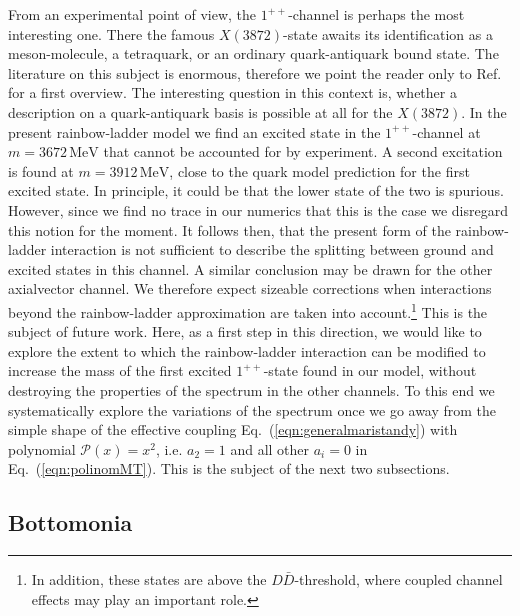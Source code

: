 From an experimental point of view, the $1^{++}$-channel is perhaps the most interesting
one. There the famous $X(3872)$-state awaits its identification as a meson-molecule,
a tetraquark, or an ordinary quark-antiquark bound state. The literature on this
subject is enormous, therefore we point the reader only to Ref.~\cite{Bodwin:2013nua} 
for a first overview. The interesting question in this context is, whether a description
on a quark-antiquark basis is possible at all for the $X(3872)$. In the present
rainbow-ladder model we find an excited state in the $1^{++}$-channel at 
$m = 3672 \,\mbox{MeV}$ that cannot be accounted for by experiment. A second excitation 
is found at $m = 3912 \,\mbox{MeV}$, close to the quark model prediction for the first
excited state. In principle, it could be that the lower state of the two is spurious.
However, since we find no trace in our numerics that this is the case we disregard this
notion for the moment. It follows then, that the present form of the rainbow-ladder 
interaction is not sufficient to describe the splitting between ground and excited states
in this channel. A similar conclusion may be drawn for the other axialvector channel.
We therefore expect sizeable corrections when interactions beyond the 
rainbow-ladder approximation are taken into account.\footnote{In addition, these states are above 
the $D\bar{D}$-threshold, where coupled channel effects may play an important role.}
This is the subject of future work. 
Here, as a first
step in this direction, we would like to explore the extent to which the rainbow-ladder 
interaction can be modified to increase the mass of the first excited $1^{++}$-state found 
in our model, without destroying the properties of the spectrum in the other channels. 
To this end we systematically explore the variations of the spectrum once we go away 
from the simple shape of the effective coupling Eq.~(\ref{eqn:generalmaristandy}) with 
polynomial $\mathcal{P}(x) = x^2$, i.e. $a_2=1$ and all other $a_i=0$ in 
Eq.~(\ref{eqn:polinomMT}). This is the subject of the next two subsections.
   
%
%
%
%

%
%
%
\subsection*{Bottomonia}\label{sec:bottom}


